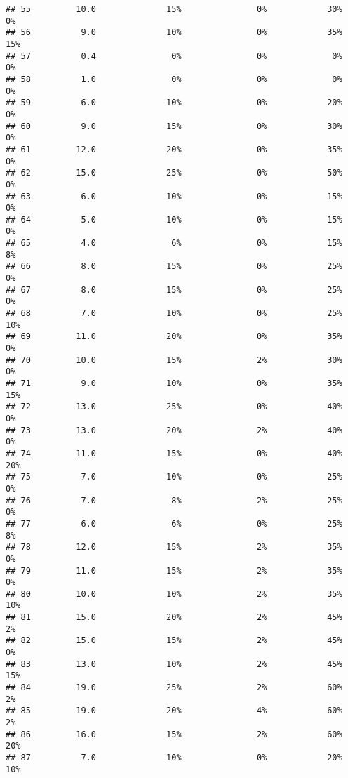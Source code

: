 \documentclass[
]{article}
\begin{document}
\begin{verbatim}
## 55         10.0              15%               0%            30%          0%
## 56          9.0              10%               0%            35%         15%
## 57          0.4               0%               0%             0%          0%
## 58          1.0               0%               0%             0%          0%
## 59          6.0              10%               0%            20%          0%
## 60          9.0              15%               0%            30%          0%
## 61         12.0              20%               0%            35%          0%
## 62         15.0              25%               0%            50%          0%
## 63          6.0              10%               0%            15%          0%
## 64          5.0              10%               0%            15%          0%
## 65          4.0               6%               0%            15%          8%
## 66          8.0              15%               0%            25%          0%
## 67          8.0              15%               0%            25%          0%
## 68          7.0              10%               0%            25%         10%
## 69         11.0              20%               0%            35%          0%
## 70         10.0              15%               2%            30%          0%
## 71          9.0              10%               0%            35%         15%
## 72         13.0              25%               0%            40%          0%
## 73         13.0              20%               2%            40%          0%
## 74         11.0              15%               0%            40%         20%
## 75          7.0              10%               0%            25%          0%
## 76          7.0               8%               2%            25%          0%
## 77          6.0               6%               0%            25%          8%
## 78         12.0              15%               2%            35%          0%
## 79         11.0              15%               2%            35%          0%
## 80         10.0              10%               2%            35%         10%
## 81         15.0              20%               2%            45%          2%
## 82         15.0              15%               2%            45%          0%
## 83         13.0              10%               2%            45%         15%
## 84         19.0              25%               2%            60%          2%
## 85         19.0              20%               4%            60%          2%
## 86         16.0              15%               2%            60%         20%
## 87          7.0              10%               0%            20%         10%

\end{verbatim}
\end{document}
